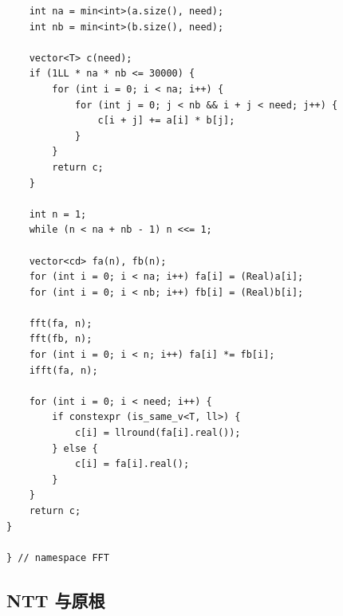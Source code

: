 \begin{lstlisting}
    int na = min<int>(a.size(), need);
    int nb = min<int>(b.size(), need);

    vector<T> c(need);
    if (1LL * na * nb <= 30000) {
        for (int i = 0; i < na; i++) {
            for (int j = 0; j < nb && i + j < need; j++) {
                c[i + j] += a[i] * b[j];
            }
        }
        return c;
    }

    int n = 1;
    while (n < na + nb - 1) n <<= 1;

    vector<cd> fa(n), fb(n);
    for (int i = 0; i < na; i++) fa[i] = (Real)a[i];
    for (int i = 0; i < nb; i++) fb[i] = (Real)b[i];

    fft(fa, n);
    fft(fb, n);
    for (int i = 0; i < n; i++) fa[i] *= fb[i];
    ifft(fa, n);

    for (int i = 0; i < need; i++) {
        if constexpr (is_same_v<T, ll>) {
            c[i] = llround(fa[i].real());
        } else {
            c[i] = fa[i].real();
        }
    }
    return c;
}

} // namespace FFT
\end{lstlisting}

\subsection{NTT 与原根}
\par

